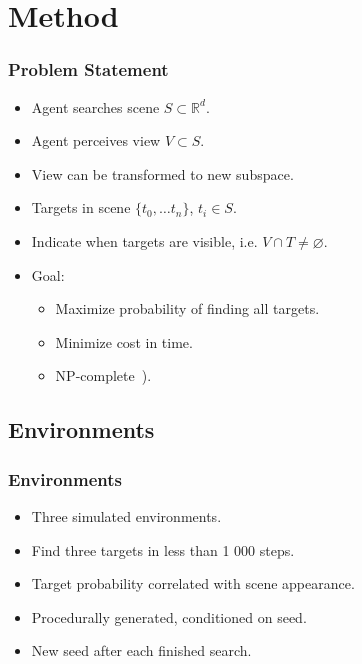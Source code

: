 \section{Method}

\begin{frame}
    \frametitle{Problem Statement}

    \begin{itemize}
        \item Agent searches scene \(S \subset \mathbb{R}^d\).
        \item Agent perceives view \(V \subset S\).
        \item View can be transformed to new subspace.
        \item Targets in scene \(\{t_0, \dots t_n\}\), \(t_i \in S\).
        \item Indicate when targets are visible, i.e. \(V \cap T \neq \varnothing\). 
        \item Goal:
        \begin{itemize}
            \item Maximize probability of finding all targets.
            \item Minimize cost in time.
            \item NP-complete~\cite{andreopoulos_theory_2009}). %
        \end{itemize}
    \end{itemize}
\end{frame}

\subsection{Environments}

\begin{frame}
    \frametitle{Environments}
    
    \begin{itemize}
        \item Three simulated environments.
        \item Find three targets in less than 1 000 steps.
        \item Target probability correlated with scene appearance. %
        \item Procedurally generated, conditioned on seed.
        \item New seed after each finished search.
    \end{itemize}
\end{frame}

